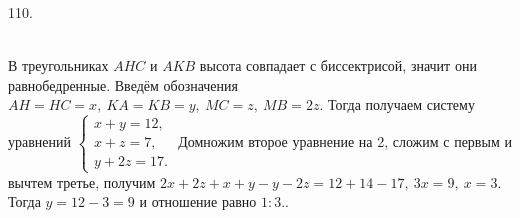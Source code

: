 \documentclass[12pt]{article}
\begin{document}
110. \begin{figure}[ht!]
\end{figure}\\
В треугольниках $AHC$ и $AKB$ высота совпадает с биссектрисой, значит они равнобедренные. Введём обозначения $AH=HC=x,\ KA=KB=y,\ MC=z,\ MB=2z.$ Тогда получаем систему уравнений $\begin{cases} x+y=12,\\ x+z=7,\\ y+2z=17.\end{cases}$ Домножим второе уравнение на 2, сложим с первым и вычтем третье, получим $2x+2z+x+y-y-2z=12+14-17,\ 3x=9,\ x=3.$ Тогда $y=12-3=9$ и отношение равно $1:3.$\newpage{}. \begin{figure}[ht!]
\end{figure}\\
\end{document}

